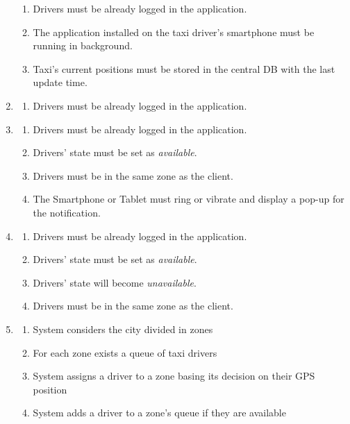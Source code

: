 \documentclass[a4paper]{article}
\begin{document}
\begin{enumerate}[label=\bfseries G\arabic*:]
\begin{enumerate}[label=\bfseries R\arabic*:]
        \item Drivers must be already logged in the application.
        \item The application installed on the taxi driver's smartphone must be running in background.
        \item Taxi's current positions must be stored in the central DB with the last update time.
        \end{enumerate}
    \item
        \begin{enumerate}[label=\bfseries R\arabic*:]
        \item Drivers must be already logged in the application.
        \end{enumerate}
    \item
        \begin{enumerate}[label=\bfseries R\arabic*:]
        \item Drivers must be already logged in the application.
        \item Drivers' state must be set as \emph{available}.
        \item Drivers must be in the same zone as the client.
        \item The Smartphone or Tablet must ring or vibrate and display a pop-up for the notification.
        \end{enumerate}
    \item
        \begin{enumerate}[label=\bfseries R\arabic*:]
        \item Drivers must be already logged in the application.
        \item Drivers' state must be set as \emph{available}.
        \item Drivers' state will become \emph{unavailable}.
        \item Drivers must be in the same zone as the client.
        \end{enumerate}
    \item 
        \begin{enumerate}[label=\bfseries R\arabic*:]
        \item System considers the city divided in zones
        \item For each zone exists a queue of taxi drivers
        \item System assigns a driver to a zone basing its decision on their GPS position
        \item System adds a driver to a zone's queue if they are available

\end{enumerate}
\end{enumerate}
\end{document}
